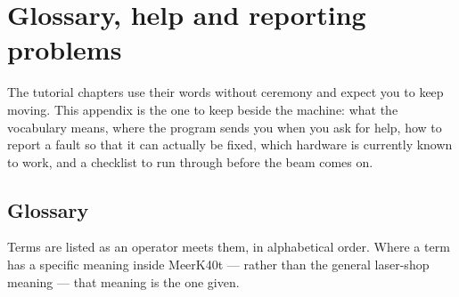 \chapter{Glossary, help and reporting problems}
\label{app:glossary}

The tutorial chapters use their words without ceremony and expect you to keep
moving. This appendix is the one to keep beside the machine: what the vocabulary
means, where the program sends you when you ask for help, how to report a fault
so that it can actually be fixed, which hardware is currently known to work,
and a checklist to run through before the beam comes on.

\section*{Glossary}

Terms are listed as an operator meets them, in alphabetical order. Where a term
has a specific meaning inside MeerK40t --- rather than the general laser-shop
meaning --- that meaning is the one given.

